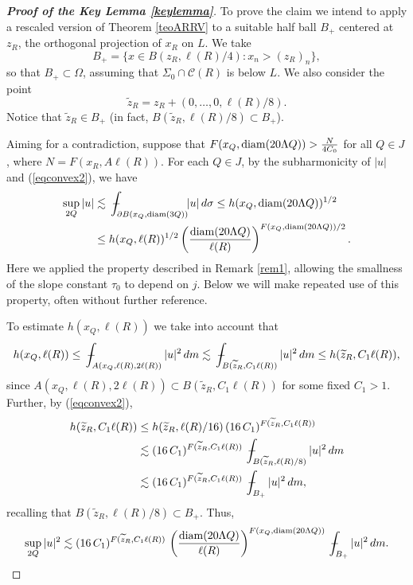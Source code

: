 \documentclass[11pt]{amsart}
\newcommand{\CC}{{\mathcal C}}
\newcommand{\diam}{{\rm diam}}
\newcommand{\rf}[1]{{(\ref{#1})}}
\newcommand{\wt}[1]{{\widetilde{#1}}}
\def\Xint#1{\mathchoice
{\XXint\displaystyle\textstyle{#1}}%
{\XXint\textstyle\scriptstyle{#1}}%
{\XXint\scriptstyle\scriptscriptstyle{#1}}%
{\XXint\scriptscriptstyle\scriptscriptstyle{#1}}%
\!\int}
\def\XXint#1#2#3{{\setbox0=\hbox{$#1{#2#3}{\int}$ }
\vcenter{\hbox{$#2#3$ }}\kern-.58\wd0}}
\def\avint{\;\Xint-}
\theoremstyle{definition}
\theoremstyle{remark}
\numberwithin{equation}{section}
\begin{document}
\begin{proof}[\bf Proof of the Key Lemma \ref{keylemma}]
To prove the claim we intend to apply a rescaled version of Theorem \ref{teoARRV} to a suitable half ball $B_+$ centered
at $z_R$, the orthogonal projection of $x_R$ on $L$. We take
$$B_+ = \big\{x\in B(z_R,\ell(R)/4):x_n> (z_R)_n\big\},$$
so that $B_+\subset \Omega$, assuming that $\Sigma_0\cap\CC(R)$ is below $L$. We also consider the point
$$\wt z_R = z_R + (0,\ldots,0,\ell(R)/8).$$
Notice that $\wt z_R\in B_+$ (in fact, $B(\wt z_R,\ell(R)/8)\subset B_+$).


Aiming for a contradiction, suppose that $F(x_Q,\diam(20\Lambda Q))> \frac N{4C_0}$ for all $Q\in J$, where 
$N=F(x_R,A\ell(R))$.
For each $Q\in J$, by the subharmonicity of $|u|$ and \rf{eqconvex2}, we have
\begin{align*}
\sup_{2Q}|u|  &\lesssim \avint_{\partial B(x_Q,\diam(3Q))}\!\!|u|\,d\sigma \leq h(x_Q,\diam(20\Lambda Q))^{1/2}\\
&\leq h(x_Q,\ell(R))^{1/2}
\left(\frac{\diam(20\Lambda Q)}{\ell(R)}\right)^{F(x_Q,\diam(20\Lambda Q))/2}.
\end{align*}
Here we applied the property described in Remark \ref{rem1}, allowing the smallness of the slope constant $\tau_0$ to depend on $j$. Below we will make repeated use of this property, often without further reference.

To estimate $h(x_Q,\ell(R))$ we take into account that
$$h(x_Q,\ell(R))\leq \avint_{A(x_Q,\ell(R),2\ell(R))}|u|^2\,dm \lesssim \avint_{B(\wt z_R,C_1\ell(R))}|u|^2\,dm
\leq h(\wt z_R,C_1\ell(R)),
$$
since $A(x_Q,\ell(R),2\ell(R))\subset B(\wt z_R,C_1\ell(R))$ for some fixed $C_1>1$.
Further, by \rf{eqconvex2},
\begin{align*}
h(\wt z_R,C_1\ell(R)) & \leq h(\wt z_R,\ell(R)/16) \,(16\, C_1)^{F(\wt z_R,C_1\ell(R))}\\
& \lesssim 
(16\, C_1)^{F(\wt z_R,C_1\ell(R))}\,\avint_{B(\wt z_R,\ell(R)/8)} |u|^2\,dm\\
&\lesssim 
(16\, C_1)^{F(\wt z_R,C_1\ell(R))}\,\avint_{B_+} |u|^2\,dm,
\end{align*}
recalling that $B(\wt z_R,\ell(R)/8)\subset B_+$.
Thus,
\begin{equation}\label{eqkey47}
\sup_{2Q}|u|^2 \lesssim (16\, C_1)^{F(\wt z_R,C_1\ell(R))}\,\left(\frac{\diam(20\Lambda Q)}{\ell(R)}\right)^{F(x_Q,\diam(20\Lambda Q))}\avint_{B_+} |u|^2\,dm.
\end{equation}


\end{proof}
\end{document}
